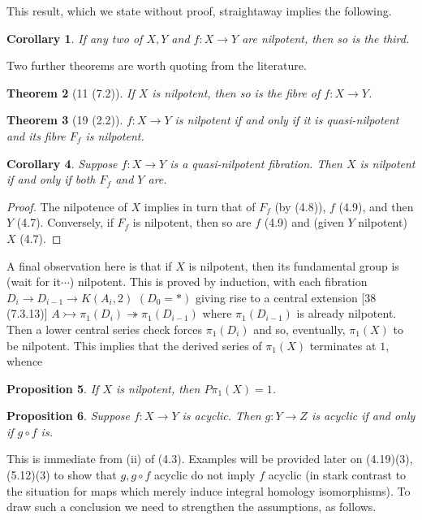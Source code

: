 \documentclass[openany,leqno]{book}  %
\newtheorem{theorem}{Theorem}[chapter]
\newtheorem{prop}[theorem]{Proposition}
\newtheorem{corollary}[theorem]{Corollary}
\begin{document}
This result, which we state without proof, straightaway implies the following.
\begin{corollary}
  If any two of $X, Y$ and $f \colon   X\longrightarrow Y$ are nilpotent, then so is the third.
\end{corollary}

Two further theorems are worth quoting from the literature.
\begin{theorem}
[11 (7.2)] If $X$ is nilpotent, then so is the fibre of $f \colon   X\longrightarrow Y$.
\end{theorem}
\begin{theorem}
[19 (2.2)] $f \colon   X\longrightarrow Y$ is nilpotent if and only if it is quasi-nilpotent and its fibre $F_f$ is nilpotent.
 \end{theorem} 
\begin{corollary}
   Suppose $f\colon   X \longrightarrow Y$ is a quasi-nilpotent fibration. Then $X$ is nilpotent if and only if both $F_f$ and $Y$ are.
\end{corollary}
\begin{proof}
The nilpotence of $X$ implies in turn that of $F_f$ (by (4.8)), $f$ (4.9), and then $Y$ (4.7). Conversely, if $F_f$ is nilpotent, then so are $f$ (4.9) and (given $Y$ nilpotent) $X$ (4.7).
\end{proof}

A final observation here is that if $X$ is nilpotent, then its fundamental group is (wait for it$\cdots$) nilpotent. This is proved by induction, with each fibration $D_i\longrightarrow D_{i-1} \longrightarrow K(A_i, 2)$ $(D_0 = *)$ giving rise to a central extension [38 (7.3.13)] $A \rightarrowtail \pi_1(D_i) \twoheadrightarrow \pi_1(D_{i-1})$ where $\pi_1(D_{i-1})$ is
already nilpotent. Then a lower central series check forces $\pi_1(D_{i})$ and so, eventually, $\pi_1(X)$ to be nilpotent. This implies that the derived series of $\pi_1(X)$ terminates at $1$, whence
\begin{prop}
	If $X$ is nilpotent, then $P\pi_1(X)= 1$.
\end{prop}
\begin{prop}
 	Suppose $f\colon   X \longrightarrow Y$ is acyclic. Then $g \colon   Y \longrightarrow Z$ is acyclic if and only if $g\circ f$ is.
 \end{prop} 
This is immediate from (ii) of (4.3). Examples will be provided later on (4.19)(3),
(5.12)(3) to show that $g, g\circ f$ acyclic do not imply $f$ acyclic (in stark contrast to the situation for maps which merely induce integral homology isomorphisms). To draw such a conclusion we need to strengthen the assumptions, as follows.
\end{document}
